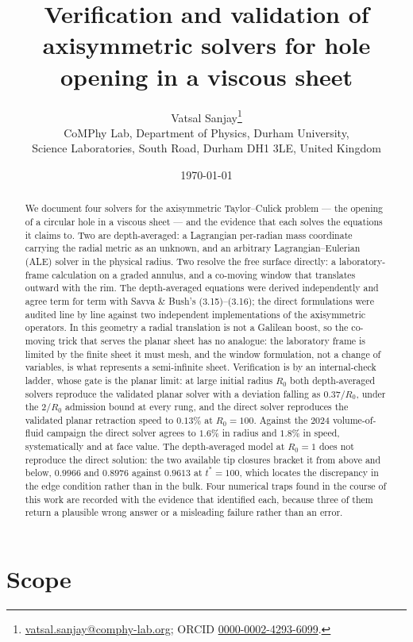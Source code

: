 \documentclass[11pt,a4paper]{article}
\title{Verification and validation of axisymmetric solvers for
hole opening in a viscous sheet}
\author{%
  Vatsal Sanjay\thanks{%
    \href{mailto:vatsal.sanjay@comphy-lab.org}{vatsal.sanjay@comphy-lab.org};
    ORCID \href{https://orcid.org/0000-0002-4293-6099}{0000-0002-4293-6099}.}\\[2pt]
  \normalsize CoMPhy Lab, Department of Physics, Durham University,\\
  \normalsize Science Laboratories, South Road, Durham DH1 3LE, United Kingdom}
\date{\today}
\begin{document}
\maketitle

\begin{abstract}
We document four solvers for the axisymmetric Taylor--Culick problem --- the
opening of a circular hole in a viscous sheet --- and the evidence that each
solves the equations it claims to. Two are depth-averaged: a Lagrangian
per-radian mass coordinate carrying the radial metric as an unknown, and an
arbitrary Lagrangian--Eulerian (ALE) solver in the physical radius. Two resolve
the free surface directly: a laboratory-frame calculation on a graded annulus,
and a co-moving window that translates outward with the rim. The depth-averaged
equations were derived independently and agree term for term with Savva \&
Bush's (3.15)--(3.16); the direct formulations were audited line by line against
two independent implementations of the axisymmetric operators. In this geometry
a radial translation is not a Galilean boost, so the co-moving trick that serves
the planar sheet has no analogue: the laboratory frame is limited by the finite
sheet it must mesh, and the window formulation, not a change of variables, is
what represents a semi-infinite sheet. Verification is by an internal-check
ladder, whose gate is the planar limit: at large initial radius $R_{0}$ both
depth-averaged solvers reproduce the validated planar solver with a deviation
falling as $0.37/R_{0}$, under the $2/R_{0}$ admission bound at every rung, and
the direct solver reproduces the validated planar retraction speed to $0.13\%$
at $R_{0}=100$. Against the 2024 volume-of-fluid campaign the direct solver
agrees to $1.6\%$ in radius and $1.8\%$ in speed, systematically and at face
value. The depth-averaged model at $R_{0}=1$ does not reproduce the direct
solution: the two available tip closures bracket it from above and below,
$0.9966$ and $0.8976$ against $0.9613$ at $t^{*}=100$, which locates the
discrepancy in the edge condition rather than in the bulk. Four numerical traps
found in the course of this work are recorded with the evidence that identified
each, because three of them return a plausible wrong answer or a misleading
failure rather than an error.
\end{abstract}

\section{Scope}
\label{sec:scope}
\end{document}
